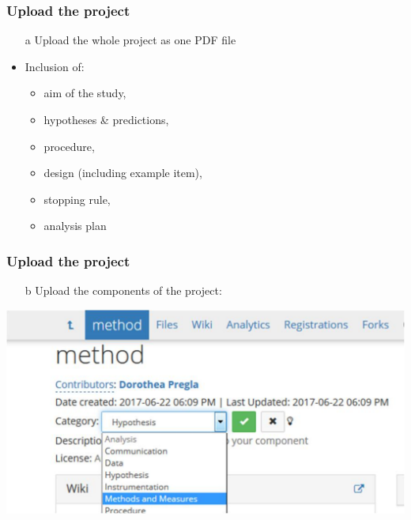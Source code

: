 \documentclass{beamer}
\begin{document}
\begin{frame}
\frametitle{Upload the project}
\begin{itemize}
		\item[a] Upload the whole project as one PDF file
		\item Inclusion of:
		\begin{itemize}
			\item aim of the study, 
			\item hypotheses \& predictions, 
			\item procedure, 
			\item design (including example item), 
			\item stopping rule,
			\item analysis plan
		\end{itemize}
\end{itemize}
\end{frame}

\begin{frame}
\frametitle{Upload the project}
\begin{itemize}
		\item[b] Upload the components of the project:
\end{itemize}
\begin{center}
\includegraphics[scale=0.4]{prereg2.pdf}
\end{center}
\end{frame}
\end{document}
